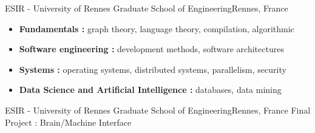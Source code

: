 {ESIR - University of Rennes Graduate School of Engineering}{Rennes, France
}
{
\begin{itemize}
\item \textbf{Fundamentals :} graph theory, language theory, compilation, algorithmic
\item \textbf{Software engineering :} development methods, software architectures
\item \textbf{Systems :} operating systems, distributed systems, parallelism, security
\item \textbf{Data Science and Artificial Intelligence :} databases, data mining
\end{itemize}
}
{ESIR - University of Rennes Graduate School of Engineering}{Rennes, France}
{Final Project : Brain/Machine Interface}